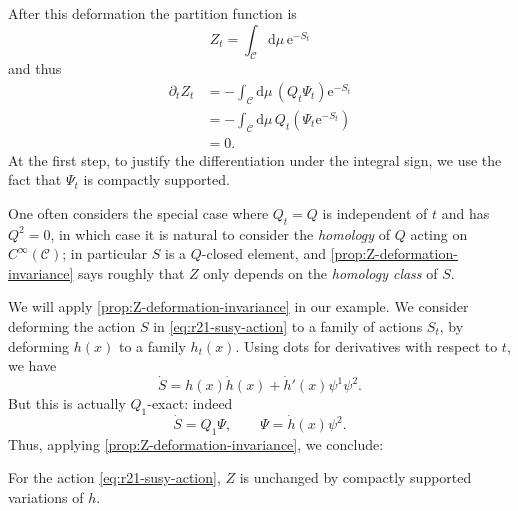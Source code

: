 \documentclass[12pt,letterpaper,reqno]{article}
\numberwithin{equation}{section}
\newcommand{\cC}{\ensuremath{\mathcal C}}
\newcommand{\e}{{\mathrm e}}
\newcommand{\de}{\mathrm{d}}
\newcommand{\IP}[1]{\langle#1\rangle}
\newcommand{\ti}[1]{\textit{#1}}
\begin{document}
\begin{pf}
After this deformation the partition function is
\begin{equation}
  Z_t = \int_\cC \de \mu \, \e^{-S_t}
\end{equation}
and thus
\begin{align}
  \partial_t Z_t &= -\int_\cC \de \mu \, (Q_t \Psi_t) \e^{-S_t} \\
  &= -\int_\cC \de \mu \, Q_t \left( \Psi_t \e^{-S_t} \right) \\
  &= 0.
\end{align}
At the first step, to justify the differentiation under the 
integral sign, we use the fact that $\Psi_t$ is compactly supported.
\end{pf}

One often considers the special case where 
$Q_t = Q$ is independent of $t$ and 
has $Q^2 = 0$, in which case it is natural to consider
the \ti{homology} of $Q$ acting on $C^\infty(\cC)$;
in particular $S$ is a $Q$-closed element, and \autoref{prop:Z-deformation-invariance}
says roughly that $Z$ only depends on the \ti{homology class} of $S$.

We will apply \autoref{prop:Z-deformation-invariance} in our example.
We consider deforming the action $S$ in \eqref{eq:r21-susy-action} 
to a family of actions $S_t$, by deforming $h(x)$
to a family $h_t(x)$.
Using dots for derivatives with respect to $t$, we have
\begin{equation}
  \dot S = h(x) {\dot h}(x) + {\dot h}'(x) \psi^1 \psi^2. 
\end{equation}
But this is actually $Q_1$-exact: indeed
\begin{equation} \label{eq:psi-example}
  \dot S = Q_1 \Psi, \qquad \Psi = {\dot h}(x) \psi^2.
\end{equation}
Thus, applying \autoref{prop:Z-deformation-invariance},
we conclude:
\begin{prop} 
For the action \eqref{eq:r21-susy-action}, 
$Z$ is unchanged by compactly supported variations of $h$.
\end{prop}
\end{document}
